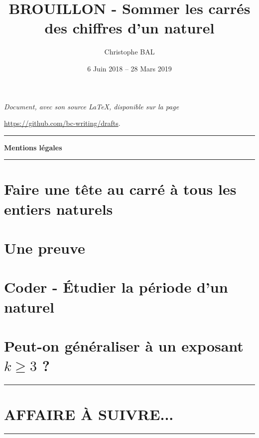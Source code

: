 \documentclass[12pt]{amsart}
\begin{document}
\title{BROUILLON - Sommer les carrés des chiffres d'un naturel}
\author{Christophe BAL}
\date{6 Juin 2018 -- 28 Mars 2019}

\maketitle

\begin{center}
    \itshape
    Document, avec son source \LaTeX, disponible sur la page

    \url{https://github.com/bc-writing/drafts}.
\end{center}


\bigskip


\begin{center}
    \hrule\vspace{.3em}
    {
        \fontsize{1.35em}{1em}\selectfont
        \textbf{Mentions \og légales \fg}
    }

    \vspace{0.45em}
    \doclicenseThis
    \hrule
\end{center}


\bigskip
\setcounter{tocdepth}{1}
\tableofcontents



\section{Faire une tête au carré à tous les entiers naturels}

\label{conjecture}


\section{Une preuve}\label{proof}




\section{Coder - Étudier la \og période \fg{} d'un naturel}




\section{\texorpdfstring{Peut-on généraliser à un exposant $k \geqslant 3$ ?}%
                        {Peut-on généraliser à un exposant k >= 3 ?}}






\bigskip

\hrule

\section{AFFAIRE À SUIVRE...}

\bigskip

\hrule


%
%
\end{document}
